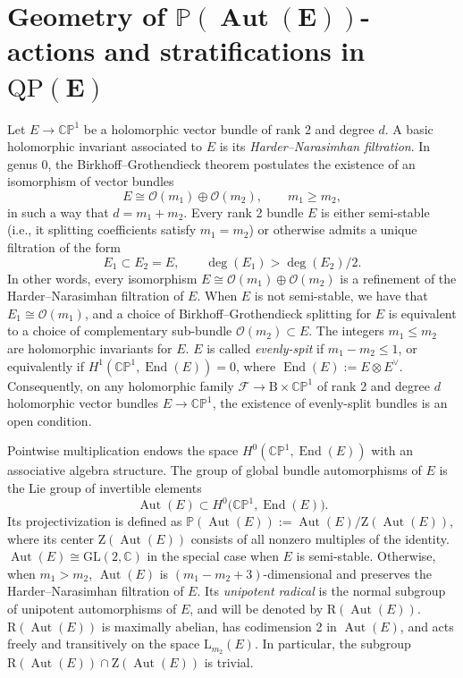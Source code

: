 \documentclass[10pt,a4paper]{amsart}
\newcommand{\field}[1]{\ensuremath{\mathbb{#1}}}
\newcommand{\CC}{\field{C}}
\newcommand{\PP}{\field{P}}
\newcommand{\calO}{\mathcal{O}}
\newcommand{\curly}[1]{\mathscr{#1}}
\newcommand{\cF}{\curly{F}}
\DeclareMathOperator{\Aut}{Aut}
\DeclareMathOperator{\End}{End}
\numberwithin{equation}{section}
\begin{document}
\section[Geometry of P(Aut(E))-actions and stratifications in QP(E)]
{Geometry of $\boldsymbol{\PP(\Aut(E))}$-actions and stratifications in $\boldsymbol{\mathrm{QP}(E)}$}\label{sec:ev-data-bundles}

Let $E\rightarrow \CC\PP^{1}$ be a holomorphic vector bundle of rank 2 and degree $d$. A basic holomorphic invariant associated to $E$ is its \textit{Harder--Narasimhan filtration}. In genus 0, the Birkhoff--Grothendieck theorem postulates the existence of an isomorphism of vector bundles
\[
E\cong \calO(m_{1})\oplus\calO(m_{2}),\qquad m_{1}\geq m_{2},
\]
in such a way that $d=m_{1}+m_{2}$. Every rank 2 bundle $E$ is either semi-stable (i.e., it splitting coefficients satisfy $m_{1}=m_{2}$) or otherwise admits a unique filtration of the form
\[
E_{1}\subset E_{2} = E,\qquad \deg(E_{1}) >\deg(E_{2})/2.
\]
In other words, every isomorphism $E\cong \calO(m_{1})\oplus\calO(m_{2})$ is a refinement of the Harder--Nara\-sim\-han filtration of $E$. When $E$ is not semi-stable, we have that $E_{1}\cong \calO(m_{1})$, and a choice of Birkhoff--Grothendieck splitting for $E$ is equivalent to a choice of complementary sub-bundle $\calO(m_{2})\subset E$. The integers $m_{1}\leq m_{2}$ are holomorphic invariants for $E$. $E$ is called \emph{evenly-spit} if $m_{1}-m_{2}\leq 1$, or equivalently if $H^{1}(\CC\PP^{1},\End (E))=0$, where $\End(E):= E\otimes E^{\vee}$. Consequently, on any holomorphic family $\cF\rightarrow \mathrm{B}\times\CC\PP^{1}$ of rank 2 and degree $d$ holomorphic vector bundles $E\rightarrow\CC\PP^{1}$, the existence of evenly-split bundles is an open condition.

Pointwise multiplication endows the space $H^{0}(\CC\PP^{1},\End (E))$ with an associative algebra structure. The group of global bundle automorphisms of $E$ is the Lie group of invertible ele\-ments
\[
\Aut(E)\subset H^{0}\bigl(\CC\PP^{1},\End (E)\bigr).
\]
Its projectivization is defined as $\PP(\Aut (E)):=\Aut(E)/\mathrm{Z}(\Aut(E))$, where its center $\mathrm{Z}(\Aut(E))$ consists of all nonzero multiples of the identity. $\Aut(E)\cong\mathrm{GL}(2,\CC)$ in the special case when $E$ is semi-stable. Otherwise, when $m_{1}>m_{2}$, $\Aut(E)$ is $(m_{1}-m_{2}+3)$-dimensional and preserves the Harder--Narasimhan filtration of $E$. Its \emph{unipotent radical} is the normal subgroup of unipotent automorphisms of $E$, and will be denoted by $\mathrm{R}(\Aut(E))$. $\mathrm{R}(\Aut(E))$ is maximally abelian, has codimension 2 in $\Aut(E)$, and acts freely and transitively on the space $\mathrm{L}_{m_{2}}(E)$. In particular, the subgroup $\mathrm{R}(\Aut(E))\cap \mathrm{Z}(\Aut(E))$ is trivial.
\end{document}
